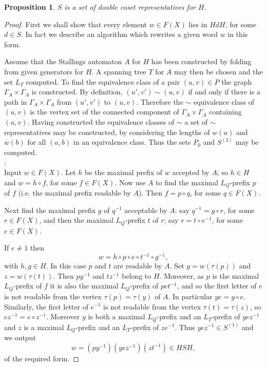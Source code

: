 \documentclass[a4paper,12pt]{article}
\newcommand{\G}{\Gamma }
\renewcommand{\t}{\tau }
\newtheorem{proposition}[theorem]{Proposition}
\numberwithin{equation}{section}
\numberwithin{figure}{section}
\begin{document}
\begin{proposition}\label{prop:dcreps}
$S$ is a set of double coset representatives for $H$.
\end{proposition}
\begin{proof}
First we shall show that every element $w\in F(X)$ lies in $HdH$,
for some $d\in S$. In fact we describe an algorithm which
rewrites a given word $w$ in this form.

Assume that the Stallings automaton $A$ for $H$ has been constructed by folding from
given generators for $H$. A spanning tree $T$
for $A$ may then be chosen and the
set $L_T$ computed. 
To find the equivalence class of a pair $(u,v)\in P$ the 
graph $\G_A\times \G_A$ is constructed. By definition, $(u',v')\sim 
(u,v)$ if and only if there is a path in $\G_A\times \G_A$ from $(u',v')$
to $(u,v)$. Therefore the $\sim$ equivalence class of $(u,v)$ is the
vertex set of the connected component of $\G_A\times \G_A$ containing
$(u,v)$.   
Having constructed the equivalence classes of $\sim$
 a set of $\sim$ representatives may be constructed, by considering the
lengths of $w(a)$ and $w(b)$ for all $(a,b)$ in an equivalence class. Thus the
sets $P_0$ and $S^{(2)}$ may be computed.   \\

:\\
Input $w\in F(X)$.
Let $h$ be the maximal prefix of $w$ accepted by $A$; so $h\in H$ and
$w=h\circ f$, for some $f\in F(X)$. Now use $A$ to find the maximal 
$L_Q$-prefix $p$
of $f$ (i.e. the maximal prefix readable by $A$). Then
  $f= p\circ q$, for some $q\in F(X)$.

Next find the maximal prefix $g$ of $q^{-1}$ acceptable by $A$: say
$q^{-1}=g\circ r$, for some $r\in F(X)$, and then the maximal $L_Q$-prefix
$t$ of $r$; say $r=t\circ e^{-1}$, for some $e\in F(X)$.

If $e\neq 1$ then
\[w=h\circ p \circ e\circ t^{-1}\circ g^{-1},\]
with $h,g\in H$. In this case $p$ and $t$ are readable by $A$. Set $y=w(\t(p))$
and $z=w(\t(t))$. Then $py^{-1}$ and $tz^{-1}$ belong to $H$. Moreover, as $p$
is the maximal $L_Q$-prefix of $f$ it is also the maximal
$L_Q$-prefix of $pet^{-1}$,  and so
  the
first letter of $e$ is not readable from the vertex $\t(p)=\t(y)$ of $A$.
In particular
$ye=y\circ e$. Similarly, the first letter of $e^{-1}$ is not readable from
the vertex $\t(t)=\t(z)$, so $ez^{-1}=e\circ z^{-1}$. Moreover $y$ is both 
a
maximal $L_Q$-prefix  and an $L_T$-prefix of $yez^{-1}$ and $z$ is a 
maximal $L_Q$-prefix  and an $L_T$-prefix of $ze^{-1}$.
Thus $yez^{-1}\in S^{(1)}$ and we output
\[w=(py^{-1}) (yez^{-1})(zt^{-1})\in HSH,\]
of the required form.


\end{proof}
\end{document}
